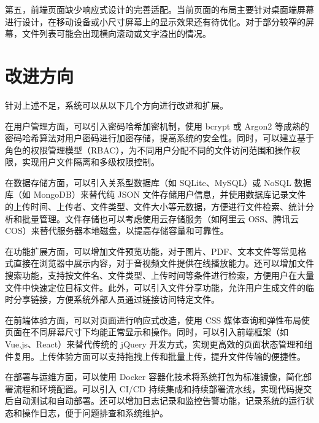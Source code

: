 \documentclass[UTF8,zihao=-4]{ctexrep}
\begin{document}
第五，前端页面缺少响应式设计的完善适配。当前页面的布局主要针对桌面端屏幕进行设计，在移动设备或小尺寸屏幕上的显示效果还有待优化。对于部分较窄的屏幕，文件列表可能会出现横向滚动或文字溢出的情况。

\section{改进方向}

针对上述不足，系统可以从以下几个方向进行改进和扩展。

在用户管理方面，可以引入密码哈希加密机制，使用 bcrypt 或 Argon2 等成熟的密码哈希算法对用户密码进行加密存储，提高系统的安全性。同时，可以建立基于角色的权限管理模型（RBAC），为不同用户分配不同的文件访问范围和操作权限，实现用户文件隔离和多级权限控制。

在数据存储方面，可以引入关系型数据库（如 SQLite、MySQL）或 NoSQL 数据库（如 MongoDB）来替代纯 JSON 文件存储用户信息，并使用数据库记录文件的上传时间、上传者、文件类型、文件大小等元数据，方便进行文件检索、统计分析和批量管理。文件存储也可以考虑使用云存储服务（如阿里云 OSS、腾讯云 COS）来替代服务器本地磁盘，以提高存储容量和可靠性。

在功能扩展方面，可以增加文件预览功能，对于图片、PDF、文本文件等常见格式直接在浏览器中展示内容，对于音视频文件提供在线播放能力。还可以增加文件搜索功能，支持按文件名、文件类型、上传时间等条件进行检索，方便用户在大量文件中快速定位目标文件。此外，可以引入文件分享功能，允许用户生成文件的临时分享链接，方便系统外部人员通过链接访问特定文件。

在前端体验方面，可以对页面进行响应式改造，使用 CSS 媒体查询和弹性布局使页面在不同屏幕尺寸下均能正常显示和操作。同时，可以引入前端框架（如 Vue.js、React）来替代传统的 jQuery 开发方式，实现更高效的页面状态管理和组件复用。上传体验方面可以支持拖拽上传和批量上传，提升文件传输的便捷性。

在部署与运维方面，可以使用 Docker 容器化技术将系统打包为标准镜像，简化部署流程和环境配置。可以引入 CI/CD 持续集成和持续部署流水线，实现代码提交后自动测试和自动部署。还可以增加日志记录和监控告警功能，记录系统的运行状态和操作日志，便于问题排查和系统维护。
\end{document}
